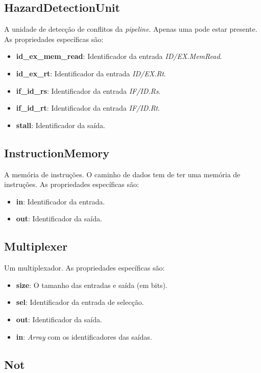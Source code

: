 \documentclass[11pt,a4paper,twoside,titlepage]{report}
\begin{document}
\subsection{HazardDetectionUnit}
A unidade de detecção de conflitos da \emph{pipeline}. Apenas uma pode estar
presente.
As propriedades específicas são:
\begin{itemize}
	\item \textbf{id\_ex\_mem\_read}: Identificador da entrada \emph{ID/EX.MemRead}.
	\item \textbf{id\_ex\_rt}: Identificador da entrada \emph{ID/EX.Rt}.
	\item \textbf{if\_id\_rs}: Identificador da entrada \emph{IF/ID.Rs}.
	\item \textbf{if\_id\_rt}: Identificador da entrada \emph{IF/ID.Rt}.
	\item \textbf{stall}: Identificador da saída.
\end{itemize}

\subsection{InstructionMemory}

A memória de instruções. O caminho de dados tem de ter uma memória de instruções.
As propriedades específicas são:
\begin{itemize}
	\item \textbf{in}: Identificador da entrada.
	\item \textbf{out}: Identificador da saída.
\end{itemize}

\subsection{Multiplexer}

Um multiplexador. As propriedades específicas são:
\begin{itemize}
	\item \textbf{size}: O tamanho das entradas e saída (em bits).
	\item \textbf{sel}: Identificador da entrada de selecção.
	\item \textbf{out}: Identificador da saída.
	\item \textbf{in}: \emph{Array} com os identificadores das saídas.
\end{itemize}

\subsection{Not}
\end{document}
